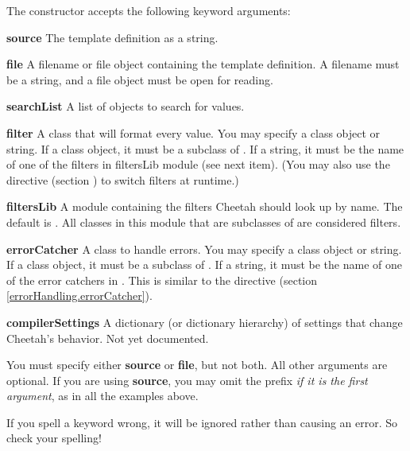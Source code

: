 The constructor accepts the following keyword arguments:

\begin{description}
\item{{\bf source}}
     The template definition as a string.  
\item{{\bf file}}
     A filename or file object containing the template definition.
     A filename must be a string, and a file object must be open for reading.
\item{{\bf searchList}}
     A list of objects to search for  values.
\item{{\bf filter}}
     A class that will format every  value.  You may
     specify a class object or string.  If a class object,
     it must be a subclass of .  If a string, it
     must be the name of one of the filters in filtersLib module (see next 
     item).
     (You may also use the  directive (section
     \label{output.filter}) to switch filters at runtime.)
\item{{\bf filtersLib}}
     A module containing the filters Cheetah should look up by name.  The
     default is .  All classes in this module that are
     subclasses of  are considered filters.
\item{{\bf errorCatcher}}
     A class to handle  errors.  You may
     specify a class object or string.  If a class object,
     it must be a subclass of .  
     If a string, it must be the name of one of the error catchers in
     .  This is similar to the 
      directive 
     (section \ref{errorHandling.errorCatcher}).
\item{{\bf compilerSettings}}
     A dictionary (or dictionary hierarchy) of settings that change Cheetah's
     behavior.  Not yet documented.
\end{description}

You must specify either {\bf source} or {\bf file}, but not both.  All other
arguments are optional.  If you are using {\bf source}, you may omit the
 prefix {\em if it is the first argument}, as in all the examples
above.

If you spell a keyword wrong, it will be ignored rather than causing an error.
So check your spelling!


